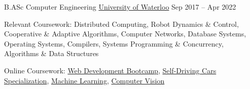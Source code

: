 \documentclass[]{awesome-cv}
\begin{document}
\begin{cventries}
	\cventry
	{B.ASc Computer Engineering}
	{\href{https://uwaterloo.ca/future-students/programs/computer-engineering}{University of Waterloo}}
	{}
	{Sep 2017 – Apr 2022}
	{\begin{cvitems}
	    \item Relevant Coursework: Distributed Computing, Robot Dynamics \& Control, Cooperative \& Adaptive Algorithms, Computer Networks, Database Systems, Operating Systems, Compilers, Systems Programming \& Concurrency, Algorithms \& Data Structures
	    \item Online Coursework: \href{https://www.udemy.com/certificate/UC-28be8e98-f2a4-4989-b09c-df1ee4a4cc03/}{Web Development Bootcamp},
	    \href{https://www.coursera.org/account/accomplishments/specialization/BA8UYMH6SUSL}{Self-Driving Cars Specialization},
	    \href{https://www.coursera.org/account/accomplishments/verify/AELG6KXXJ88V}{Machine Learning}, \href{https://www.udemy.com/certificate/UC-TJRJ90AG/}{Computer Vision}
	\end{cvitems}}
\end{cventries}
\end{document}
